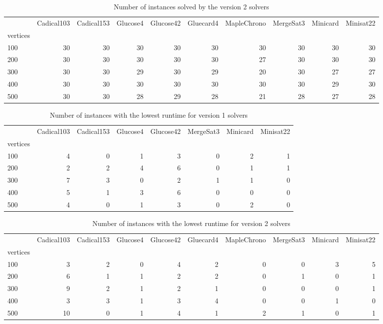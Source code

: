 \begin{table}[htbp]
\centering
\footnotesize
\setlength{\tabcolsep}{2pt}
\begin{tabular}{lrrrrrrrrr}
\toprule
 & Cadical103 & Cadical153 & Glucose4 & Glucose42 & Gluecard4 & MapleChrono & MergeSat3 & Minicard & Minisat22 \\
vertices &  &  &  &  &  &  &  &  &  \\
\midrule
100 & 30 & 30 & 30 & 30 & 30 & 30 & 30 & 30 & 30 \\
200 & 30 & 30 & 30 & 30 & 30 & 27 & 30 & 30 & 30 \\
300 & 30 & 30 & 29 & 30 & 29 & 20 & 30 & 27 & 27 \\
400 & 30 & 30 & 30 & 30 & 30 & 30 & 30 & 29 & 30 \\
500 & 30 & 30 & 28 & 29 & 28 & 21 & 28 & 27 & 28 \\
\bottomrule
\end{tabular}
\caption{Number of instances solved by the version 2 solvers}
\label{tab:SAT_num_solved_v2}
\end{table}

\begin{table}[htbp]
\centering
\footnotesize
\setlength{\tabcolsep}{2pt}
\begin{tabular}{lrrrrrrr}
\toprule
 & Cadical103 & Cadical153 & Glucose4 & Glucose42 & MergeSat3 & Minicard & Minisat22 \\
vertices &  &  &  &  &  &  &  \\
\midrule
100 & 4 & 0 & 1 & 3 & 0 & 2 & 1 \\
200 & 2 & 2 & 4 & 6 & 0 & 1 & 1 \\
300 & 7 & 3 & 0 & 2 & 1 & 1 & 0 \\
400 & 5 & 1 & 3 & 6 & 0 & 0 & 0 \\
500 & 4 & 0 & 1 & 3 & 0 & 2 & 0 \\
\bottomrule
\end{tabular}
\caption{Number of instances with the lowest runtime for version 1 solvers}
\label{tab:SAT_small_time_v1}
\end{table}

\begin{table}[htbp]
\centering
\footnotesize
\setlength{\tabcolsep}{2pt}
\begin{tabular}{lrrrrrrrrr}
\toprule
 & Cadical103 & Cadical153 & Glucose4 & Glucose42 & Gluecard4 & MapleChrono & MergeSat3 & Minicard & Minisat22 \\
vertices &  &  &  &  &  &  &  &  &  \\
\midrule
100 & 3 & 2 & 0 & 4 & 2 & 0 & 0 & 3 & 5 \\
200 & 6 & 1 & 1 & 2 & 2 & 0 & 1 & 0 & 1 \\
300 & 9 & 2 & 1 & 2 & 1 & 0 & 0 & 0 & 1 \\
400 & 3 & 3 & 1 & 3 & 4 & 0 & 0 & 1 & 0 \\
500 & 10 & 0 & 1 & 4 & 1 & 2 & 1 & 0 & 1 \\
\bottomrule
\end{tabular}
\caption{Number of instances with the lowest runtime for version 2 solvers}
\label{tab:SAT_small_time_v2}
\end{table}


